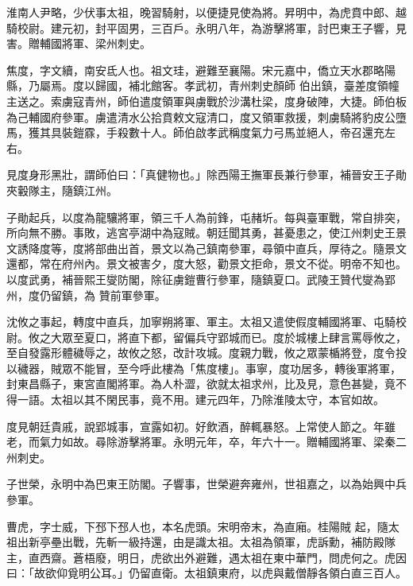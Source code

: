 \begin{pinyinscope}
 淮南人尹略，少伏事太祖，晚習騎射，以便捷見使為將。昇明中，為虎賁中郎、越騎校尉。建元初，封平固男，三百戶。永明八年，為游擊將軍，討巴東王子響，見害。贈輔國將軍、梁州刺史。



 焦度，字文續，南安氐人也。祖文珪，避難至襄陽。宋元嘉中，僑立天水郡略陽縣，乃屬焉。度以歸國，補北館客。孝武初，青州刺史顏師
 伯出鎮，臺差度領幢主送之。索虜寇青州，師伯遣度領軍與虜戰於沙溝杜梁，度身破陣，大捷。師伯板為己輔國府參軍。虜遣清水公拾賁敕文寇清口，度又領軍救援，刺虜騎將豹皮公墮馬，獲其具裝鎧霡，手殺數十人。師伯啟孝武稱度氣力弓馬並絕人，帝召還充左右。



 見度身形黑壯，謂師伯曰：「真健物也。」除西陽王撫軍長兼行參軍，補晉安王子勛夾轂隊主，隨鎮江州。



 子勛起兵，以度為龍驤將軍，領三千人為前鋒，屯赭圻。每與臺軍戰，常自排突，所向無不勝。事敗，逃宮亭湖中為寇賊。朝廷聞其勇，甚憂患之，使江州刺史王景文誘降度等，度將部曲出首，景文以為己鎮南參軍，尋領中直兵，厚待之。隨景文還都，常在府州內。景文被害夕，度大怒，勸景文拒命，景文不從。明帝不知也。以度武勇，補晉熙王燮防閣，除征虜鎧曹行參軍，隨鎮夏口。武陵王贊代燮為郢州，度仍留鎮，為
 贊前軍參軍。



 沈攸之事起，轉度中直兵，加寧朔將軍、軍主。太祖又遣使假度輔國將軍、屯騎校尉。攸之大眾至夏口，將直下都，留偏兵守郢城而已。度於城樓上肆言罵辱攸之，至自發露形體穢辱之，故攸之怒，改計攻城。度親力戰，攸之眾蒙楯將登，度令投以穢器，賊眾不能冒，至今呼此樓為「焦度樓」。事寧，度功居多，轉後軍將軍，封東昌縣子，東宮直閣將軍。為人朴澀，欲就太祖求州，比及見，意色甚變，竟不得一語。太祖以其不閑民事，竟不用。建元四年，乃除淮陵太守，本官如故。



 度見朝廷貴戚，說郢城事，宣露如初。好飲酒，醉輒暴怒。上常使人節之。年雖老，而氣力如故。尋除游擊將軍。永明元年，卒，年六十一。贈輔國將軍、梁秦二州刺史。



 子世榮，永明中為巴東王防閣。子響事，世榮避奔雍州，世祖嘉之，以為始興中兵參軍。



 曹虎，字士威，下邳下邳人也，本名虎頭。宋明帝末，為直廂。桂陽賊
 起，隨太祖出新亭壘出戰，先斬一級持還，由是識太祖。太祖為領軍，虎訴勳，補防殿隊主，直西齋。蒼梧廢，明日，虎欲出外避難，遇太祖在東中華門，問虎何之。虎因曰：「故欲仰覓明公耳。」仍留直衛。太祖鎮東府，以虎與戴僧靜各領白直三百人。




\end{pinyinscope}
